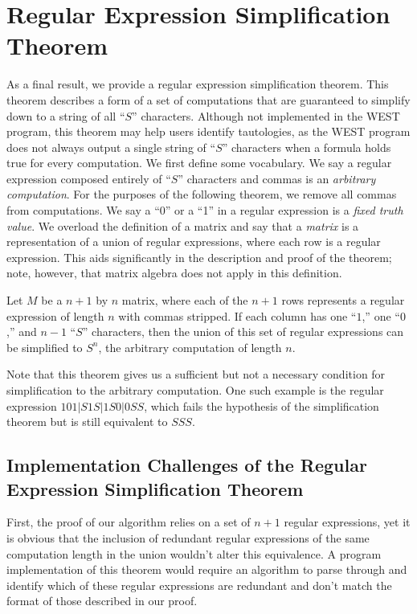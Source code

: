 \documentclass[runningheads]{llncs}
\begin{document}
\section{Regular Expression Simplification Theorem} \label{simpsection}
As a final result, we provide a regular expression simplification theorem. This theorem describes a form of a set of computations that are guaranteed to simplify down to a string of all ``$S$'' characters. Although not implemented in the WEST program, this theorem may help users identify tautologies, as the WEST program does not always output a single string of ``$S$'' characters when a formula holds true for every computation. We first define some vocabulary.
 We say a regular expression composed entirely of ``$S$'' characters and commas is an \emph{arbitrary computation}. For the purposes of the following theorem, we remove all commas from computations. We say a ``0'' or a ``1'' in a regular expression is a \emph{fixed truth value}. We overload the definition of a matrix and say that a \emph{matrix} is a representation of a union of regular expressions, where each row is a regular expression. This aids significantly in the description and proof of the theorem; note, however, that matrix algebra does not apply in this definition. 
\begin{theorem} \label{simp}
Let $M$ be a $n+1$ by $n$ matrix, where each of the $n+1$ rows represents a regular expression of length $n$ with commas stripped. If each column has one ``$1$,'' one ``$0$,'' and $n-1$ ``$S$'' characters, then the union of this set of regular expressions can be simplified to $S^n$, the arbitrary computation of length $n$.
\end{theorem}
Note that this theorem gives us a sufficient but not a necessary condition for simplification to the arbitrary computation. One such example is the regular expression $101|S1S|1S0|0SS$, which fails the hypothesis of the  simplification theorem but is still equivalent to $SSS$.
\subsection{Implementation Challenges of the Regular Expression Simplification Theorem}
First, the proof of our algorithm relies on a set of $n+1$ regular expressions, yet it is obvious that the inclusion of redundant regular expressions of the same computation length in the union wouldn't alter this equivalence. A program implementation of this theorem would require an algorithm to parse through and identify which of these regular expressions are redundant and don't match the format of those described in our proof.
\end{document}
